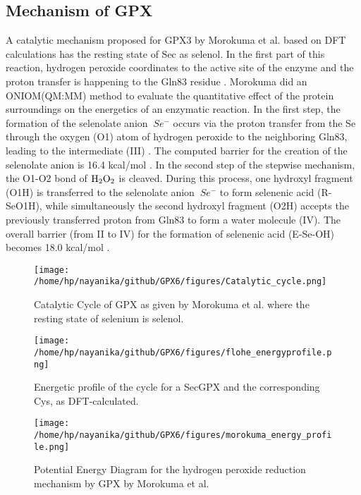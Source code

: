 \documentclass[journal=jacsat,manuscript=article]{achemso}
\begin{document}
\subsection{Mechanism of GPX}

A catalytic mechanism proposed for GPX3 by Morokuma et al. based on DFT calculations has the resting state of Sec as selenol. In the first part of this reaction, hydrogen peroxide coordinates to the active site of the enzyme and the proton transfer is happening to the Gln83 residue \cite{Prabhakar2006, Prabhakar2005}. Morokuma \cite{Prabhakar2006} did an ONIOM(QM:MM) method to evaluate the quantitative effect of the protein surroundings on the energetics of an enzymatic reaction. In the first step, the formation of the selenolate anion \({\ Se^-}\) occurs via the proton transfer from the Se through the oxygen (O1) atom of hydrogen peroxide to the neighboring Gln83, leading to the intermediate (III) \cite{Prabhakar2006}. The computed barrier for the creation of the selenolate anion is 16.4 kcal/mol \cite{Prabhakar2006}. In the second step of the stepwise mechanism, the O1-O2 bond of $\ce{H_2O_2}$ is cleaved. During this process, one hydroxyl fragment (O1H) is transferred to the selenolate anion \({\ Se^-}\) to form selenenic acid (R-SeO1H), while simultaneously the second hydroxyl fragment (O2H) accepts the previously transferred proton from Gln83 to form a water molecule (IV). The overall barrier (from II to IV) for the formation of selenenic acid (E-Se-OH) becomes 18.0 kcal/mol \cite{Prabhakar2006}.

\begin{figure}[h]
\texttt{[image: /home/hp/nayanika/github/GPX6/figures/Catalytic\_cycle.png]}
\caption{Catalytic Cycle of GPX as given by Morokuma et al. where the resting state of selenium is selenol.}
\label{fig:figure1}
\end{figure}

\begin{wrapfigure}{h}{0.7\textwidth}
\texttt{[image: /home/hp/nayanika/github/GPX6/figures/flohe\_energyprofile.png]} 
\caption{Energetic profile of the cycle for a SecGPX and the corresponding Cys, as DFT-calculated.}
\label{fig:figure2}
\end{wrapfigure}

\begin{figure}[h]
\texttt{[image: /home/hp/nayanika/github/GPX6/figures/morokuma\_energy\_profile.png]}
\caption{Potential Energy Diagram for the hydrogen peroxide reduction mechanism by GPX by Morokuma et al.}
\label{fig:figure3}
\end{figure}
\end{document}
